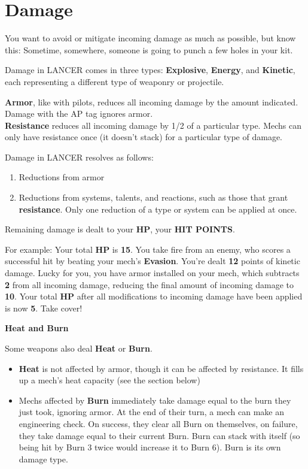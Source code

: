 \section{Damage}

You want to avoid or mitigate incoming damage as much as possible, but know this: Sometime, somewhere, someone is going to punch a few holes in your kit. 

Damage in LANCER comes in three types: \textbf{Explosive}, \textbf{Energy}, and \textbf{Kinetic}, each representing a different type of weaponry or projectile. 

\textbf{Armor}, like with pilots, reduces all incoming damage by the amount indicated. Damage with the AP tag ignores armor.\\
\textbf{Resistance} reduces all incoming damage by 1/2 of a particular type. Mechs can only have resistance once (it doesn't stack) for a particular type of damage. 

Damage in LANCER resolves as follows: 
\begin{enumerate}
\item Reductions from armor
\item Reductions from systems, talents, and reactions, such as those that grant \textbf{resistance}. Only one reduction of a type or system can be applied at once.
\end{enumerate}  
Remaining damage is dealt to your \textbf{HP}, your \textbf{HIT POINTS}. 

For example: Your total \textbf{HP} is  \textbf{15}. You take fire from an enemy, who scores a successful hit by beating your mech's \textbf{Evasion}. You're dealt \textbf{12} points of kinetic damage. Lucky for you, you have armor installed on your mech, which subtracts \textbf{2} from all incoming damage, reducing the final amount of incoming damage to  \textbf{10}. Your total \textbf{HP} after all modifications to incoming damage have been applied is now \textbf{5}. Take cover!

\begin{center}
  \textbf{Heat and Burn}
\end{center}

Some weapons also deal \textbf{Heat} or \textbf{Burn}.
\begin{itemize}
\item \textbf{Heat} is not affected by armor, though it can be affected by resistance. It fills up a mech's heat capacity (see the section below) 
\item Mechs affected by \textbf{Burn} immediately take damage equal to the burn they just took, ignoring armor. At the end of their turn, a mech can make an engineering check. On success, they clear all Burn on themselves, on failure, they take damage equal to their current Burn. Burn can stack with itself (so being hit by Burn 3 twice would increase it to Burn 6). Burn is its own damage type.
\end{itemize}
  
